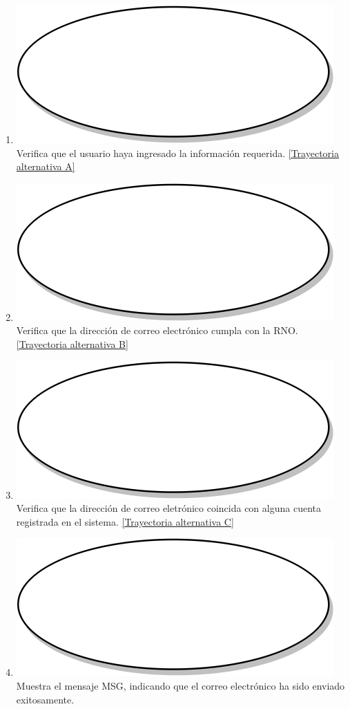 \begin{enumerate}
  \item {\includegraphics[scale=.05]{Capitulo3/img/proceso.png} Verifica que el usuario haya ingresado la información requerida. \hyperref[cu1_1_ta_a]{[Trayectoria alternativa A]}}
  \item {\includegraphics[scale=.05]{Capitulo3/img/proceso.png} Verifica que la dirección de correo electrónico cumpla con la RNO. \hyperref[cu1_1_ta_b]{[Trayectoria alternativa B]}}
  \item {\includegraphics[scale=.05]{Capitulo3/img/proceso.png} Verifica que la dirección de correo eletrónico coincida con alguna cuenta registrada en el sistema. \hyperref[cu1_1_ta_c]{[Trayectoria alternativa C]}}
  \item {\includegraphics[scale=.05]{Capitulo3/img/proceso.png} Muestra el mensaje MSG, indicando que el correo electrónico ha sido enviado exitosamente.}

\end{enumerate}
